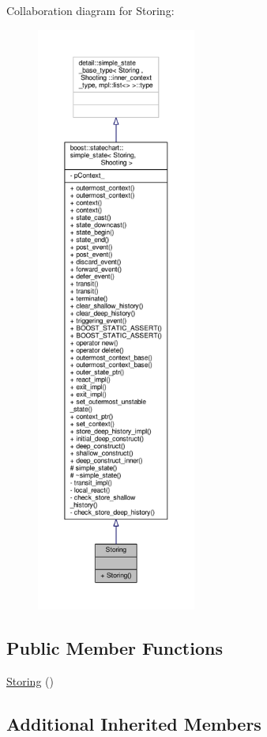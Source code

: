 Collaboration diagram for Storing\+:
\nopagebreak
\begin{figure}[H]
\begin{center}
\leavevmode
\includegraphics[height=550pt]{struct_storing__coll__graph}
\end{center}
\end{figure}
\subsection*{Public Member Functions}
\begin{DoxyCompactItemize}
\item 
\mbox{\hyperlink{struct_storing_abb1214e2f3bdef69373e27950ec1f55e}{Storing}} ()
\end{DoxyCompactItemize}
\subsection*{Additional Inherited Members}


